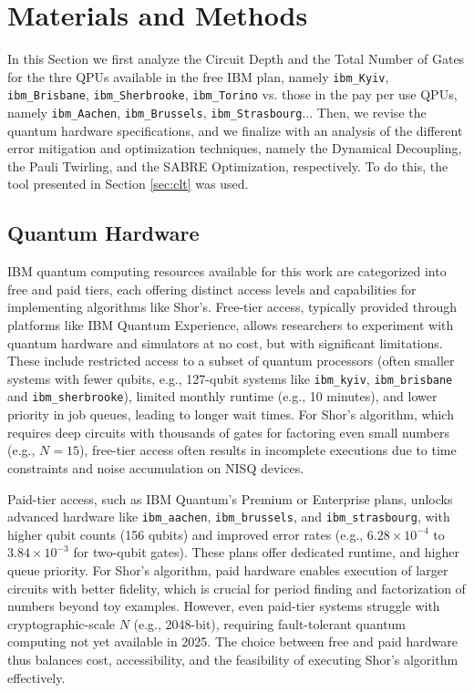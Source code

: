 \documentclass[conference,twoside]{IEEEtran}
\begin{document}
\section{Materials and Methods}
In this Section we first analyze the Circuit Depth and the Total Number of Gates for the thre QPUs available in the free IBM plan, namely \texttt{ibm\_Kyiv}, \texttt{ibm\_Brisbane}, \texttt{ibm\_Sherbrooke}, \texttt{ibm\_Torino} vs. those in the pay per use QPUs, namely \texttt{ibm\_Aachen}, \texttt{ibm\_Brussels}, \texttt{ibm\_Strasbourg}... Then, we revise the quantum hardware specifications, and we finalize with an analysis of the different error mitigation and optimization techniques, namely the Dynamical Decoupling, the Pauli Twirling, and the SABRE Optimization, respectively. To do this, the tool presented in Section \ref{sec:clt} was used.

\subsection{Quantum Hardware}
IBM quantum computing resources available for this work are categorized into free and paid tiers, each offering distinct access levels and capabilities for implementing algorithms like Shor's. Free-tier access, typically provided through platforms like IBM Quantum Experience, allows researchers to experiment with quantum hardware and simulators at no cost, but with significant limitations. These include restricted access to a subset of quantum processors (often smaller systems with fewer qubits, e.g., 127-qubit systems like \texttt{ibm\_kyiv}, \texttt{ibm\_brisbane} and \texttt{ibm\_sherbrooke}), limited monthly runtime (e.g., 10 minutes), and lower priority in job queues, leading to longer wait times. For Shor's algorithm, which requires deep circuits with thousands of gates for factoring even small numbers (e.g., \( N = 15 \)), free-tier access often results in incomplete executions due to time constraints and noise accumulation on NISQ devices.

Paid-tier access, such as IBM Quantum’s Premium or Enterprise plans, unlocks advanced hardware like \texttt{ibm\_aachen}, \texttt{ibm\_brussels}, and \texttt{ibm\_strasbourg}, with higher qubit counts (156 qubits) and improved error rates (e.g., \( 6.28 \times 10^{-4} \) to \( 3.84 \times 10^{-3} \) for two-qubit gates). These plans offer dedicated runtime, and higher queue priority. For Shor's algorithm, paid hardware enables execution of larger circuits with better fidelity, which is crucial for period finding and factorization of numbers beyond toy examples. However, even paid-tier systems struggle with cryptographic-scale \( N \) (e.g., 2048-bit), requiring fault-tolerant quantum computing not yet available in 2025. The choice between free and paid hardware thus balances cost, accessibility, and the feasibility of executing Shor's algorithm effectively.  
\end{document}
